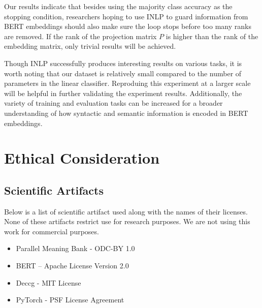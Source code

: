 \documentclass[11pt,a4paper]{article}
\begin{document}
Our results indicate that besides using the majority class accuracy as the stopping condition, researchers hoping to use INLP to guard information from BERT embeddings should also make sure the loop stops before too many ranks are removed. If the rank of the projection matrix $P$ is higher than the rank of the embedding matrix, only trivial results will be achieved.

Though INLP successfully produces interesting results on various tasks, it is worth noting that our dataset is relatively small compared to the number of parameters in the linear classifier. Reproduing this experiment at a larger scale will be helpful in further validating the experiment results. Additionally, the variety of training and evaluation tasks can be increased for a broader understanding of how syntactic and semantic information is encoded in BERT embeddings.












\section*{Ethical Consideration}
\subsection*{Scientific Artifacts}
Below is a list of scientific artifact used along with the names of their licenses. None of these artifacts restrict use for research purposes. We are not using this work for commercial purposes.

\begin{itemize}
    \item Parallel Meaning Bank\cite{pmbData} -  ODC-BY 1.0
    \item BERT\cite{bert}  – Apache License Version 2.0
    \item Deccg\cite{ccg_tagger} - MIT License
    \item PyTorch\cite{torch} - PSF License Agreement
\end{itemize}
\end{document}
